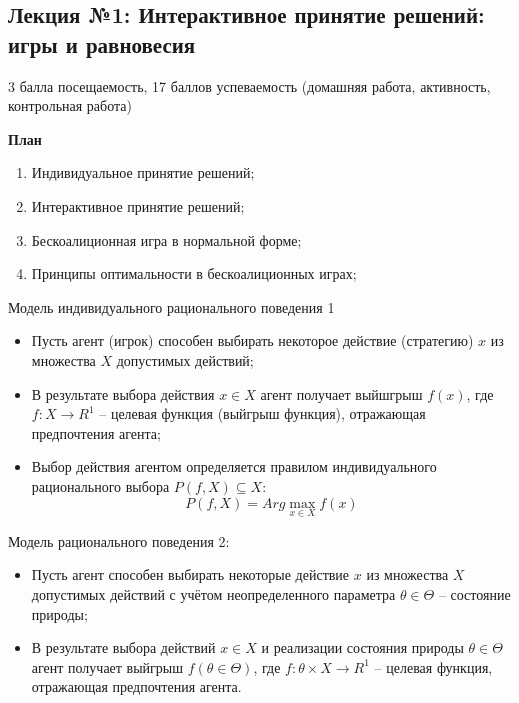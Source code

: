 \documentclass[12pt,a4paper]{article}
\author{GH-TIMe}
\begin{document}
\begin{center}
\section*{Лекция №1: Интерактивное принятие решений: игры и равновесия}
\end{center}

3 балла посещаемость, 17 баллов успеваемость (домашняя работа, активность, контрольная работа)

\begin{center}
\textbf{План}
\end{center}

\begin{enumerate}
\item Индивидуальное принятие решений;
\item Интерактивное принятие решений;
\item Бескоалиционная игра в нормальной форме;
\item Принципы оптимальности в бескоалиционных играх;
\end{enumerate}

Модель индивидуального рационального поведения 1
\begin{itemize}
\item Пусть агент (игрок) способен выбирать некоторое действие (стратегию) $x$ из множества $X$ допустимых действий;
\item В результате выбора действия $x \in X$ агент получает выйшгрыш $f(x)$, где $f: X \rightarrow R^1$ -- целевая функция (выйгрыш функция), отражающая предпочтения агента;
\item Выбор действия агентом определяется правилом индивидуального рационального выбора $P(f,X) \subseteq X$:
$$P(f,X) = Arg \max_{x \in X} f(x)$$
\end{itemize}

Модель рационального поведения 2:
\begin{itemize}
\item Пусть агент способен выбирать некоторые действие $x$ из множества $X$ допустимых действий с учётом неопределенного параметра $\theta \in \Theta$ -- состояние природы;
\item В результате выбора действий $x \in X$ и реализации состояния природы $\theta \in \Theta$ агент получает выйгрыш $f(\theta \in \Theta)$, где $f: \theta \times X \rightarrow R^1$ -- целевая функция, отражающая предпочтения агента.
\end{itemize}
\end{document}
